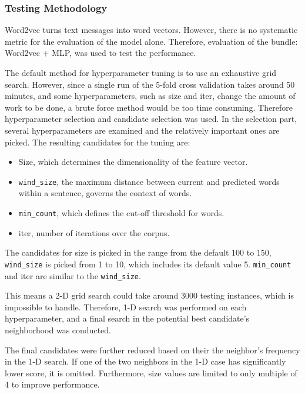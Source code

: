 \documentclass{sig-alternate-05-2015}
\begin{document}
	\subsubsection{Testing Methodology}
	Word2vec turns text messages into word vectors. However, there is no systematic metric for the evaluation of the model alone. Therefore, evaluation of the bundle: Word2vec + MLP, was used to test the performance. \par
	The default method for hyperparameter tuning is to use an exhaustive grid search. However, since a single run of the 5-fold cross validation takes around 50 minutes, and some hyperparameters, such as size and iter, change the amount of work to be done, a brute force method would be too time consuming. Therefore hyperparameter selection and candidate selection was used. In the selection part, several hyperparameters are examined and the relatively important ones are picked. The resulting candidates for the tuning are:
	\begin{itemize}
		\item Size, which determines the dimensionality of the feature vector.
		\item \texttt{wind\_size}, the maximum distance between current and predicted words within a sentence, governs the context of words.
		\item \texttt{min\_count}, which defines the cut-off threshold for words.
		\item iter, number of iterations over the corpus.
	\end{itemize}
	The candidates for size is picked in the range from the default 100 to 150, \texttt{wind\_size} is picked from 1 to 10, which includes its default value 5. \texttt{min\_count} and iter are similar to the \texttt{wind\_size}. 
	\par
	This means a 2-D grid search could take around 3000 testing instances, which is impossible to handle. Therefore, 1-D search was performed on each hyperparameter, and a final search in the potential best candidate's neighborhood was conducted.
	\par
	The final candidates were further reduced based on their the neighbor's frequency in the 1-D search. If one of the two neighbors in the 1-D case has significantly lower score, it is omitted. Furthermore, size values are limited to only multiple of 4 to improve performance.
	
\end{document}
